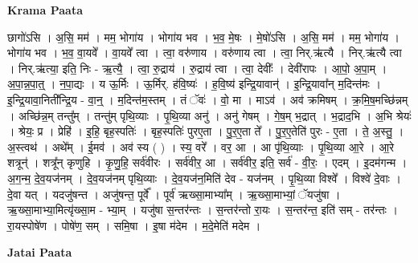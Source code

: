 \documentclass[17pt]{extarticle}
\begin{document}
\textbf{Krama Paata} \newline

छागो॑ऽसि । अ॒सि॒ मम॑ । मम॒ भोगा॑य । भोगा॑य भव । भ॒व॒ मे॒षः । मे॒षो॑ऽसि । अ॒सि॒ मम॑ । मम॒ भोगा॑य । भोगा॑य भव । भ॒व॒ वा॒यवे᳚ । वा॒यवे᳚ त्वा । त्वा॒ वरु॑णाय । वरु॑णाय त्वा । त्वा॒ निर्.ऋ॑त्यै । निर्.ऋ॑त्यै त्वा । निर्.ऋ॑त्या॒ इति॒ निः - ऋ॒त्यै॒ । त्वा॒ रु॒द्राय॑ । रु॒द्राय॑ त्वा । त्वा॒ देवीः᳚ । देवी॑रापः । आ॒पो॒ अ॒पा॒म् । अ॒पा॒न्न॒पा॒त्॒ । न॒पा॒द्यः । य ऊ॒र्मिः । ऊ॒र्मिर्. ह॑वि॒ष्यः॑ । ह॒वि॒ष्य॑ इन्द्रि॒यावान्॑ । इ॒न्द्रि॒यावा᳚न् म॒दिन्त॑मः । इ॒न्द्रि॒यावा॒निती᳚न्द्रि॒य - वा॒न्॒ । म॒दिन्त॑म॒स्तम् । तं ॅवः॑ । वो॒ मा । माऽव॑ । अव॑ क्रमिषम् । क्र॒मि॒ष॒मच्छि॑न्नम् । अच्छि॑न्न॒म् तन्तु᳚म् । तन्तु॑म् पृथि॒व्याः । पृ॒थि॒व्या अनु॑ । अनु॑ गेषम् । गे॒ष॒म् भ॒द्रात् । भ॒द्राद॒भि । अ॒भि श्रेयः॑ । श्रेयः॒ प्र । प्रेहि॑ । इ॒हि॒ बृह॒स्पतिः॑ । बृह॒स्पतिः॑ पुरए॒ता । पु॒र॒ए॒ता ते᳚ । पु॒र॒ए॒तेति॑ पुरः - ए॒ता । ते॒ अ॒स्तु॒ । अ॒स्त्वथ॑ । अथे᳚म् । ई॒मव॑ । अव॑ स्य ( ) । स्य॒ वरे᳚ । वर॒ आ । आ पृ॑थि॒व्याः । पृ॒थि॒व्या आ॒रे । आ॒रे शत्रून्॑ । शत्रू᳚न् कृणुहि । कृ॒णु॒हि॒ सर्व॑वीरः । सर्व॑वीर॒ आ । सर्व॑वीर॒ इति॒ सर्व॑ - वी॒रः॒ । एदम् । इ॒दम॑गन्म । अ॒ग॒न्म॒ दे॒व॒यज॑नम् । दे॒व॒यज॑नम् पृथि॒व्याः । दे॒व॒यज॑न॒मिति॑ देव - यज॑नम् । पृ॒थि॒व्या विश्वे᳚ । विश्वे॑ दे॒वाः । दे॒वा यत् । यदजु॑षन्त । अजु॑षन्त॒ पूर्वे᳚ । पूर्व॑ ऋख्सा॒माभ्या᳚म् । ऋ॒ख्सा॒माभ्यां॒ ॅयजु॑षा । ऋ॒ख्सा॒माभ्या॒मित्यृ॑ख्सा॒म - भ्या॒म् । यजु॑षा स॒न्तर॑न्तः । स॒न्तर॑न्तो रा॒यः । स॒न्तर॑न्त॒ इति॑ सम् - तर॑न्तः । रा॒यस्पोषे॑ण । पोषे॑ण॒ सम् । समि॒षा । इ॒षा म॑देम । म॒दे॒मेति॑ मदेम । \newline

\textbf{Jatai Paata} \newline
\end{document}
